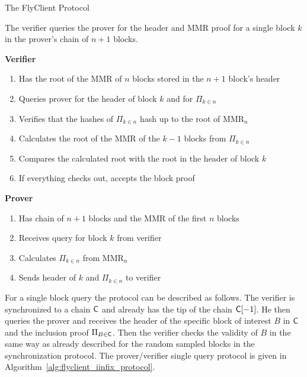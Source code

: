 \begin{section}{The FlyClient Protocol}
	\begin{algorithm}[h!]
		\caption{\label{alg:flyclient_iinfix_protocol}Prover/Verifier protocol for a single query~\cite{flyclient}}
		The verifier queries the prover for the header and MMR proof for a single block $k$ in the prover's chain of $n+1$ blocks.
		\begin{center}
			\textbf{Verifier}
		\end{center}
		\begin{enumerate}
			\item Has the root of the MMR of $n$ blocks stored in the $n+1$ block's header 
			\item Queries prover for the header of block $k$ and for $\Pi_{k \in n}$
			\item Verifies that the hashes of $\Pi_{k \in n}$ hash up to the root of MMR$_n$
			\item Calculates the root of the MMR of the $k-1$ blocks from $\Pi_{k \in n}$ 
			\item Compares the calculated root with the root in the header of block $k$
			\item If everything checks out, accepts the block proof
		\end{enumerate}
		\begin{center}
			\textbf{Prover}
		\end{center}
		\begin{enumerate}
			\item Has chain of $n+1$ blocks and the MMR of the first $n$ blocks 
			\item Receives query for block $k$ from verifier 
			\item Calculates $\Pi_{k \in n}$ from MMR$_n$
			\item Sends header of $k$ and $\Pi_{k \in n}$ to verifier
		\end{enumerate}
	\end{algorithm}

	For a single block query the protocol can be described as follows. The verifier is synchronized to a chain $\mathsf{C}$ and already has the tip of the chain $\mathsf{C}[-1]$. He then queries the prover and receives the header of the specific block of interest $B$ in $\mathsf{C}$ and the inclusion proof $\Pi_{B \in \mathsf{C}}$. Then the verifier checks the validity of $B$ in the same way as already described for the random sampled blocks in the synchronization protocol. 
	The prover/verifier single query protocol is given in Algorithm~\ref{alg:flyclient_iinfix_protocol}.


\end{section}

